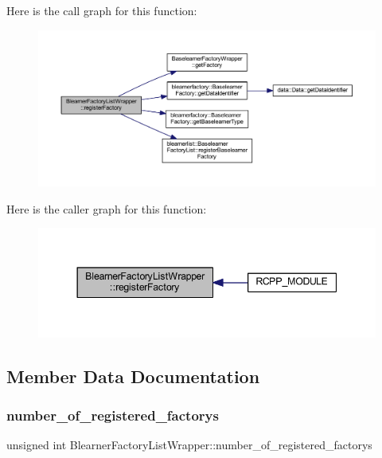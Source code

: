 Here is the call graph for this function\+:\nopagebreak
\begin{figure}[H]
\begin{center}
\leavevmode
\includegraphics[width=350pt]{class_blearner_factory_list_wrapper_a672ddef75775ba1d5f930a20a9027247_cgraph}
\end{center}
\end{figure}
Here is the caller graph for this function\+:\nopagebreak
\begin{figure}[H]
\begin{center}
\leavevmode
\includegraphics[width=344pt]{class_blearner_factory_list_wrapper_a672ddef75775ba1d5f930a20a9027247_icgraph}
\end{center}
\end{figure}


\subsection{Member Data Documentation}
\mbox{\label{class_blearner_factory_list_wrapper_a542631415e4d7c3621a3701c951c4797}} 
\subsubsection{\texorpdfstring{number\+\_\+of\+\_\+registered\+\_\+factorys}{number\_of\_registered\_factorys}}
{\footnotesize\ttfamily unsigned int Blearner\+Factory\+List\+Wrapper\+::number\+\_\+of\+\_\+registered\+\_\+factorys\hspace{0.3cm}{\ttfamily [private]}}

